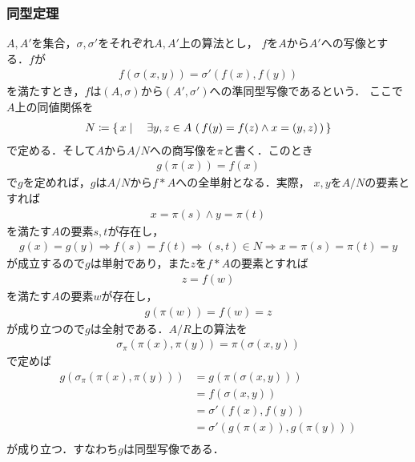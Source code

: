 \subsubsection{同型定理}
	$A,A'$を集合，$\sigma,\sigma'$をそれぞれ$A,A'$上の算法とし，
	$f$を$A$から$A'$への写像とする．$f$が
	\begin{align}
		f(\sigma(x,y)) = \sigma'(f(x),f(y))
	\end{align}
	を満たすとき，$f$は$(A,\sigma)$から$(A',\sigma')$への準同型写像であるという．
	ここで$A$上の同値関係を
	\begin{align}
		N \coloneqq \left\{\, x \mid \quad \exists y,z \in A\, 
		\left(\, f(y) = f(z) \wedge x = (y,z)\, \right)\, \right\}
	\end{align}
	で定める．そして$A$から$A/N$への商写像を$\pi$と書く．このとき
	\begin{align}
		g\left(\pi(x)\right) = f(x)
	\end{align}
	で$g$を定めれば，$g$は$A/N$から$f \ast A$への全単射となる．実際，
	$x,y$を$A/N$の要素とすれば
	\begin{align}
		x = \pi(s) \wedge y = \pi(t)
	\end{align}
	を満たす$A$の要素$s,t$が存在し，
	\begin{align}
		g(x) = g(y) \Longrightarrow f(s) = f(t)
		\Longrightarrow (s,t) \in N
		\Longrightarrow x = \pi(s) = \pi(t) = y
	\end{align}
	が成立するので$g$は単射であり，また$z$を$f \ast A$の要素とすれば
	\begin{align}
		z = f(w)
	\end{align}
	を満たす$A$の要素$w$が存在し，
	\begin{align}
		g(\pi(w)) = f(w) = z
	\end{align}
	が成り立つので$g$は全射である．$A/R$上の算法を
	\begin{align}
		\sigma_\pi(\pi(x),\pi(y)) = \pi(\sigma(x,y))
	\end{align}
	で定めば
	\begin{align}
		g \left( \sigma_\pi(\pi(x),\pi(y)) \right) 
		&= g \left( \pi(\sigma(x,y)) \right) \\
		&= f \left( \sigma(x,y) \right) \\
		&= \sigma'(f(x),f(y)) \\
		&= \sigma' \left( g(\pi(x)),g(\pi(y)) \right) \\
	\end{align}
	が成り立つ．すなわち$g$は同型写像である．
	
	
